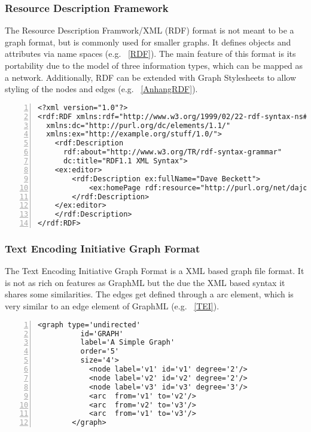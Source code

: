\subsubsection{Resource Description Framework}
The Resource Description Framwork/XML (RDF) format is not meant to be a graph format, but is commonly used for smaller graphs. It defines objects and attributes via name spaces (e.g. ~\ref{RDF}). The main feature of this format is its portability due to the model of three information types, which can be mapped as a network. Additionally, RDF can be extended with Graph Stylesheets to allow styling of the nodes and edges (e.g. ~\ref{AnhangRDF}).\cite{miller1998introduction,Lassila98resourcedescription}
\begin{center}
\begin{minipage}{.8\textwidth}
\begin{lstlisting}[numbers=left,
		stepnumber=1,caption={A Simple Graph in RDF from \cite{miller1998introduction}},captionpos=b, linewidth={\textwidth}, escapeinside=||, label=RDF]
<?xml version="1.0"?>
<rdf:RDF xmlns:rdf="http://www.w3.org/1999/02/22-rdf-syntax-ns#"
  xmlns:dc="http://purl.org/dc/elements/1.1/"
  xmlns:ex="http://example.org/stuff/1.0/">
	<rdf:Description 
	  rdf:about="http://www.w3.org/TR/rdf-syntax-grammar"
	  dc:title="RDF1.1 XML Syntax">
	<ex:editor>
		<rdf:Description ex:fullName="Dave Beckett">
			<ex:homePage rdf:resource="http://purl.org/net/dajobe/" />
		</rdf:Description>
	</ex:editor>
	</rdf:Description>
</rdf:RDF>
\end{lstlisting}
\end{minipage}
\end{center}

\subsubsection{Text Encoding Initiative Graph Format}
The Text Encoding Initiative Graph Format is a XML based graph file format. It is not as rich on features as GraphML but the due the XML based syntax it shares some similarities. The edges get defined through a arc element, which is very similar to an edge element of GraphML (e.g. ~\ref{TEI}). 
\begin{center}
	\begin{minipage}{.8\textwidth}
		\begin{lstlisting}[numbers=left,
		stepnumber=1,caption={A Simple Graph in Text Encoding Initiative Graph Format},captionpos=b, linewidth={\textwidth}, escapeinside=||,gobble=8, label=TEI]
		<graph type='undirected'
		  id='GRAPH'
		  label='A Simple Graph'
		  order='5'
		  size='4'>
			<node label='v1' id='v1' degree='2'/>
			<node label='v2' id='v2' degree='2'/>
			<node label='v3' id='v3' degree='3'/>
			<arc  from='v1' to='v2'/>
			<arc  from='v2' to='v3'/>
			<arc  from='v1' to='v3'/>
		</graph>
		\end{lstlisting}
	\end{minipage}
\end{center}
\newpage

